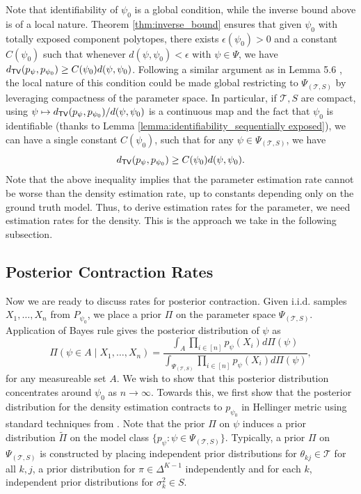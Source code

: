 \documentclass[bj,authoryear]{imsart}
\theoremstyle{plain}
\theoremstyle{remark}
\def\cT{\mathcal{T}}
\def\TV{{\sf TV}}
\begin{document}
    Note that identifiability of $\psi_0$ is a global condition, while the inverse bound above is of a local nature. Theorem \ref{thm:inverse_bound} ensures that given $\psi_0$ with totally exposed component polytopes, there exists $\epsilon(\psi_0)>0$ and a constant $C(\psi_0)$ such that whenever $d(\psi,\psi_0)<\epsilon$ with $\psi\in\Psi$, we have $d_{\TV}(p_{\psi},p_{\psi_0})\geq C(\psi_0) d(\psi,\psi_0)$. Following a similar argument as in Lemma 5.6 \cite{wei2020convergence}, the local nature of this condition could be made global restricting to $\Psi_{(\cT,S)}$ by leveraging compactness of the parameter space. In particular, if $\cT,S$ are compact, using $\psi\mapsto d_{\TV}(p_{\psi},p_{\psi_0})/d(\psi,\psi_0)$ is a continuous map and the fact that $\psi_0$ is identifiable (thanks to Lemma \ref{lemma:identifiability_sequentially exposed}), we can have a single constant $C(\psi_0)$, such that for any $\psi\in \Psi_{(\cT,S)}$, we have
    \begin{equation}\label{eq:lower_bound_tv}
        d_{\TV}(p_{\psi},p_{\psi_0}) \geq C(\psi_0) d(\psi,\psi_0).
    \end{equation}
Note that the above inequality implies that the parameter estimation rate cannot be worse than the density estimation rate, up to constants depending only on the ground truth model. Thus, to derive estimation rates for the parameter, we need estimation rates for the density. This is the approach we take in the following subsection.

\subsection{Posterior Contraction Rates}
\label{sec:posterior_contraction_rates}
Now we are ready to discuss rates for posterior contraction. Given i.i.d. samples $X_1,\dots,X_n$ from $P_{\psi_0}$, we place a prior $\Pi$ on the parameter space $\Psi_{(\cT,S)}$. Application of Bayes rule gives the posterior distribution of $\psi$ as
$$\Pi(\psi\in A \mid X_1,\dots,X_n) = \frac{\int_A \prod_{i\in[n]} p_{\psi}(X_i) d\Pi(\psi)}{\int_{\Psi_{(\cT,S)}}\prod_{i\in[n]} p_{\psi}(X_i) d\Pi(\psi) },$$
for any measureable set $A$. We wish to show that this posterior distribution concentrates around $\psi_0$ as $n\to\infty$. Towards this, we first show that the posterior distribution for the density estimation contracts to $p_{\psi_0}$ in Hellinger metric using standard techniques from \cite{ghosal2000convergence}. Note that the prior $\Pi$ on $\psi$ induces a prior distribution $\tilde{\Pi}$ on the model class $\{p_{\psi} : \psi\in \Psi_{(\cT,S)}\}$. Typically, a prior $\Pi$ on $\Psi_{(\cT,S)}$ is constructed by placing independent prior distributions for $\theta_{kj}\in\cT$ for all $k,j$, a prior distribution for $\pi\in\Delta^{K-1}$ independently and for each $k$, independent prior distributions for $\sigma_k^2\in S$. 
\end{document}
